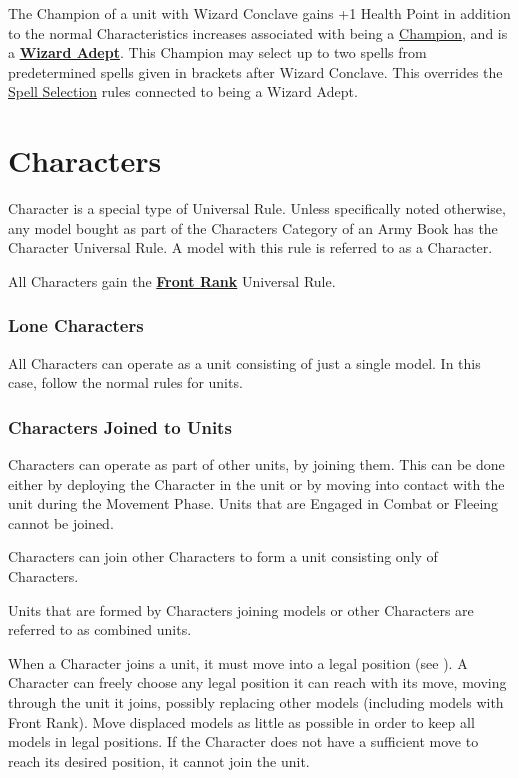 The Champion of a unit with Wizard Conclave gains +1 Health Point in addition to the normal Characteristics increases associated with being a \hyperref[champion]{Champion}, and is a \hyperref[wizard_adept]{\textbf{Wizard Adept}}. This Champion may select up to two spells from predetermined spells given in brackets after Wizard Conclave. This overrides the \hyperref[spell_selection]{Spell Selection} rules connected to being a Wizard Adept.

\section{Characters}
\label{characters}

Character is a special type of Universal Rule. Unless specifically noted otherwise, any model bought as part of the Characters Category of an Army Book has the Character Universal Rule. A model with this rule is referred to as a Character.

All Characters gain the \hyperref[front_rank]{\textbf{Front Rank}} Universal Rule.

\subsubsection{Lone Characters}

All Characters can operate as a unit consisting of just a single model. In this case, follow the normal rules for units.

\subsubsection{Characters Joined to Units}

Characters can operate as part of other units, by joining them. This can be done either by deploying the Character in the unit or by moving into contact with the unit during the Movement Phase. Units that are Engaged in Combat or Fleeing cannot be joined.

Characters can join other Characters to form a unit consisting only of Characters.

Units that are formed by Characters joining \rnf{} models or other Characters are referred to as combined units.

When a Character joins a unit, it must move into a legal position (see ). A Character can freely choose any legal position it can reach with its move, moving through the unit it joins, possibly replacing other models (including models with Front Rank). Move displaced models as little as possible in order to keep all models in legal positions. If the Character does not have a sufficient move to reach its desired position, it cannot join the unit.


